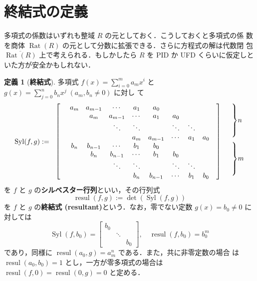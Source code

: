 \documentclass[12pt, uplatex, dvipdfmx]{jsarticle}
\newcommand{\ds}{\displaystyle}
\theoremstyle{definition}
\newtheorem*{definition}{定義}
\DeclareMathOperator{\Syl}{Syl}
\DeclareMathOperator{\resul}{resul}
\DeclareMathOperator{\Rat}{Rat}
\begin{document}
\section{終結式の定義}

多項式の係数はいずれも整域 $R$ の元としておく．こうしておくと多項式の係
数を商体 $\Rat(R)$ の元として分数に拡張できる．さらに方程式の解は代数閉
包 $\overline{\Rat(R)}$ 上で考えられる．もしかしたら $R$ を PID か UFD
くらいに仮定しといた方が安全かもしれない．


\begin{definition}[\textbf{終結式}]
  多項式 $\ds f(x) = \sum_{i=0}^{m}a_m x^i$ と $\ds g(x) = \sum_{j=0}^{n} b_n x^j \; (a_m, b_n \neq 0)$ に対し
  て
  \[
    \Syl(f,g):=
    \begin{array}{rccccccccll}
      \ldelim[{9}{12pt}[] &  a_m & a_{m-1} & \cdots & a_1 & a_0 & & & & \rdelim]{9}{12pt}[] & \rdelim\}{4}{14pt}[\(n\)]\\
                          &  & a_m & a_{m-1} & \cdots & a_1 & a_0& & & &\\
                          &  & & \ddots & \ddots & & \ddots & \ddots & & & \\
                          &  & & & a_m & a_{m-1} & \cdots & a_1 & a_0 & &\\
                          & b_n & b_{n-1} & \cdots & b_1 & b_0 & & & & &  \rdelim\}{4}{14pt}[\(m\)]\\
                          & & b_n & b_{n-1} & \cdots & b_1 & b_0 & & & & \\
                          & & & \ddots & \ddots & & \ddots & \ddots & & &\\
                          & & & & b_n & b_{n-1} & \cdots & b_1 & b_0 & &
    \end{array}
  \]
  を $f$ と $g$ の\textbf{シルベスター行列}といい，その行列式
  \[
    \resul(f,g):= \det(\Syl(f,g))
  \]
  を $f$ と $g$ の\textbf{終結式 (resultant)}という．なお，零でない定数 $g(x) = b_0 \neq 0$ に対しては
  \[
    \Syl(f, b_0) =\left[
    \begin{array}{ccc}
       b_0  & & \\
            & \ddots & \\
            & & b_0 
    \end{array}
  \right], \quad \resul(f, b_0) = b_0^m
  \]
  であり，同様に $\resul(a_0, g) = a_m^n$ である．また，共に非零定数の場合
  は $\resul(a_0, b_0)=1$ とし，一方が零多項式の場合は $\resul(f,0) =
  \resul(0,g)=0$ と定める．
\end{definition}
\end{document}
